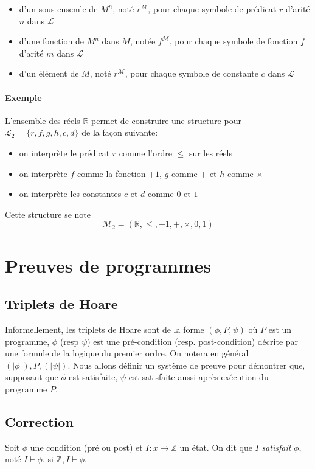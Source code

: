 \documentclass[a4paper]{article}
\begin{document}
   \begin{itemize}
     \item d'un sous ensemle de $M^n$, noté $r^{\mathcal{M}}$, pour chaque symbole
     de prédicat $r$ d'arité $n$ dans $\mathcal{L}$
     \item d'une fonction de $M^n$ dans $M$, notée $f^{\mathcal{M}}$, pour chaque symbole
     de fonction $f$ d'arité $m$ dans $\mathcal{L}$
     \item d'un élément de $M$, noté $r^{\mathcal{M}}$, pour chaque symbole de 
     constante $c$ dans $\mathcal{L}$
   \end{itemize}

   \paragraph{Exemple} L'ensemble des réels $\mathbb{R}$ permet de construire une 
   structure pour $\mathcal{L}_2 = \{r, f, g, h, c, d\}$ de la façon suivante:

   \begin{itemize}
     \item on interprète le prédicat $r$ comme l'ordre $\leq$ sur les réels
     \item on interprète $f$ comme la fonction $+1$, $g$ comme $+$ et $h$ comme $\times$
     \item on interprète les constantes $c$ et $d$ comme $0$ et $1$
   \end{itemize}
   Cette structure se note $$ \mathcal{M}_2 = (\mathbb{R}, \leq, +1, +, \times, 0, 1) $$ 


\section{Preuves de programmes}
  \subsection{Triplets de Hoare}
  Informellement, les triplets de Hoare sont de la forme $(\phi, P, \psi)$ où $P$
  est un programme, $\phi$ (resp $\psi$) est une pré-condition (resp. post-condition) 
  décrite par une formule de la logique du premier ordre. On notera en général $(|\phi|), P, (|\psi|)$.
  Nous allons définir un système de preuve pour démontrer que, supposant que $\phi$
  est satisfaite, $\psi$ est satisfaite aussi après exécution du programme $P$.

  \subsection{Correction}
  Soit $\phi$ une condition (pré ou post) et $I:x\rightarrow \mathbb{Z}$ un état. 
  On dit que $I$ \textit{satisfait} $\phi$, noté $I \vdash \phi$, si $\mathbb{Z}, I \vdash \phi$.\\
\end{document}
